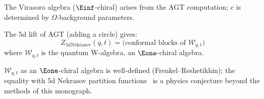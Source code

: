 \begin{corollary}%
The Virasoro algebra ($\Einf$-chiral) arises from the AGT computation; $c$ is determined by $\Omega$-background parameters.
\end{corollary}


\begin{conjecture}%
The 5d lift of AGT (adding a circle) gives:
\[
Z_{\mathrm{5d Nekrasov}}(q, t) = \text{(conformal blocks of } \mathcal{W}_{q,t})
\]
where $\mathcal{W}_{q,t}$ is the quantum W-algebra, an $\Eone$-chiral algebra.
\end{conjecture}

\begin{remark}[Scope]
$\mathcal{W}_{q,t}$ as an $\Eone$-chiral algebra is well-defined (Frenkel--Reshetikhin); the equality with 5d Nekrasov partition functions~\cite{AY10} is a physics conjecture beyond the methods of this monograph.
\end{remark}

